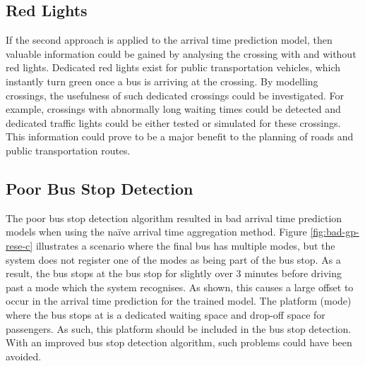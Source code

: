 \subsection{Red Lights}
If the second approach is applied to the arrival time prediction model, then valuable information could be gained by analysing the crossing with and without red lights.
Dedicated red lights exist for public transportation vehicles, which instantly turn green once a bus is arriving at the crossing.
By modelling crossings, the usefulness of such dedicated crossings could be investigated.
For example, crossings with abnormally long waiting times could be detected and dedicated traffic lights could be either tested or simulated for these crossings.
This information could prove to be a major benefit to the planning of roads and public transportation routes. 

\subsection{Poor Bus Stop Detection}
The poor bus stop detection algorithm resulted in bad arrival time prediction models when using the naïve arrival time aggregation method.
Figure \ref{fig:bad-gp-rese-c} illustrates a scenario where the final bus has multiple modes, but the system does not register one of the modes as being part of the bus stop.
As a result, the bus stops at the bus stop for slightly over 3 minutes before driving past a mode which the system recognises.
As shown, this causes a large offset to occur in the arrival time prediction for the trained model.
The platform (mode) where the bus stops at is a dedicated waiting space and drop-off space for passengers.
As such, this platform should be included in the bus stop detection.
With an improved bus stop detection algorithm, such problems could have been avoided.

